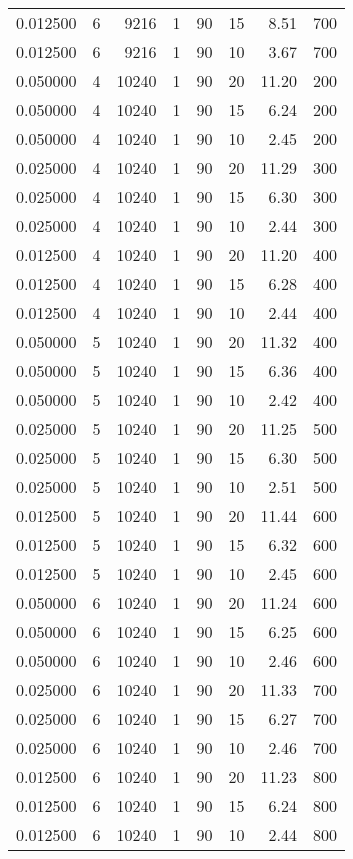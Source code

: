 \documentclass[12pt,letterpaper]{article}
\begin{document}
\begin{center}
\begin{longtable}{r|r|r|r|r|r|r|r}
0.012500 & 6 & 9216 & 1 & 90 & 15 & 8.51 & 700 \\
0.012500 & 6 & 9216 & 1 & 90 & 10 & 3.67 & 700 \\
0.050000 & 4 & 10240 & 1 & 90 & 20 & 11.20 & 200 \\
0.050000 & 4 & 10240 & 1 & 90 & 15 & 6.24 & 200 \\
0.050000 & 4 & 10240 & 1 & 90 & 10 & 2.45 & 200 \\
0.025000 & 4 & 10240 & 1 & 90 & 20 & 11.29 & 300 \\
0.025000 & 4 & 10240 & 1 & 90 & 15 & 6.30 & 300 \\
0.025000 & 4 & 10240 & 1 & 90 & 10 & 2.44 & 300 \\
0.012500 & 4 & 10240 & 1 & 90 & 20 & 11.20 & 400 \\
0.012500 & 4 & 10240 & 1 & 90 & 15 & 6.28 & 400 \\
0.012500 & 4 & 10240 & 1 & 90 & 10 & 2.44 & 400 \\
0.050000 & 5 & 10240 & 1 & 90 & 20 & 11.32 & 400 \\
0.050000 & 5 & 10240 & 1 & 90 & 15 & 6.36 & 400 \\
0.050000 & 5 & 10240 & 1 & 90 & 10 & 2.42 & 400 \\
0.025000 & 5 & 10240 & 1 & 90 & 20 & 11.25 & 500 \\
0.025000 & 5 & 10240 & 1 & 90 & 15 & 6.30 & 500 \\
0.025000 & 5 & 10240 & 1 & 90 & 10 & 2.51 & 500 \\
0.012500 & 5 & 10240 & 1 & 90 & 20 & 11.44 & 600 \\
0.012500 & 5 & 10240 & 1 & 90 & 15 & 6.32 & 600 \\
0.012500 & 5 & 10240 & 1 & 90 & 10 & 2.45 & 600 \\
0.050000 & 6 & 10240 & 1 & 90 & 20 & 11.24 & 600 \\
0.050000 & 6 & 10240 & 1 & 90 & 15 & 6.25 & 600 \\
0.050000 & 6 & 10240 & 1 & 90 & 10 & 2.46 & 600 \\
0.025000 & 6 & 10240 & 1 & 90 & 20 & 11.33 & 700 \\
0.025000 & 6 & 10240 & 1 & 90 & 15 & 6.27 & 700 \\
0.025000 & 6 & 10240 & 1 & 90 & 10 & 2.46 & 700 \\
0.012500 & 6 & 10240 & 1 & 90 & 20 & 11.23 & 800 \\
0.012500 & 6 & 10240 & 1 & 90 & 15 & 6.24 & 800 \\
0.012500 & 6 & 10240 & 1 & 90 & 10 & 2.44 & 800 \\

\end{longtable}
\end{center}
\end{document}
